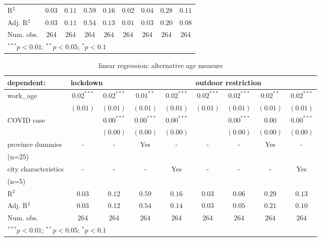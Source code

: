 \documentclass{article}
\begin{document}
\begin{CJK}{UTF8}{gbsn}
\begin{table}[H]
\begin{center}
\begin{tabular}{l c c c c c c c c}
\hline
R$^2$         & $0.03$       & $0.11$       & $0.59$       & $0.16$      & $0.02$      & $0.04$      & $0.28$   & $0.11$       \\
Adj. R$^2$    & $0.03$       & $0.11$       & $0.54$       & $0.13$      & $0.01$      & $0.03$      & $0.20$   & $0.08$       \\
Num. obs.     & $264$        & $264$        & $264$        & $264$       & $264$       & $264$       & $264$    & $264$        \\
\hline
\multicolumn{9}{l}{\scriptsize{$^{***}p<0.01$; $^{**}p<0.05$; $^{*}p<0.1$}}
\end{tabular}
\label{Table 1}
\end{center}
\end{table}


\begin{table}[H]
\caption{linear regression: alternative age measure}
\begin{center}
\begin{tabular}{l c c c c c c c c}
\hline
dependent: & \multicolumn{4}{l}{lockdown}  & \multicolumn{4}{l}{outdoor restriction}\\
\hline
work\_age  & $0.02^{***}$ & $0.02^{***}$ & $0.01^{**}$  & $0.02^{***}$ & $0.02^{***}$ & $0.02^{***}$ & $0.02^{**}$ & $0.02^{***}$ \\
           & $(0.01)$     & $(0.01)$     & $(0.01)$     & $(0.01)$     & $(0.01)$     & $(0.01)$     & $(0.01)$    & $(0.01)$     \\
COVID case &              & $0.00^{***}$ & $0.00^{***}$ & $0.00^{***}$ &              & $0.00^{***}$ & $0.00$      & $0.00^{***}$ \\
           &              & $(0.00)$     & $(0.00)$     & $(0.00)$     &              & $(0.00)$     & $(0.00)$    & $(0.00)$     \\
province dummies &-&-&Yes&-&-&-&Yes&- \\
(n=25)\\
city characteristics &-&-&-&Yes&-&-&-&Yes \\
(n=5)\\

\hline
R$^2$      & $0.03$       & $0.12$       & $0.59$       & $0.16$       & $0.03$       & $0.06$       & $0.29$      & $0.13$       \\
Adj. R$^2$ & $0.03$       & $0.12$       & $0.54$       & $0.14$       & $0.03$       & $0.05$       & $0.21$      & $0.10$       \\
Num. obs.  & $264$        & $264$        & $264$        & $264$        & $264$        & $264$        & $264$       & $264$        \\
\hline
\multicolumn{9}{l}{\scriptsize{$^{***}p<0.01$; $^{**}p<0.05$; $^{*}p<0.1$}}
\end{tabular}
\label{Table 1}
\end{center}
\end{table}


\end{CJK}
\end{document}

